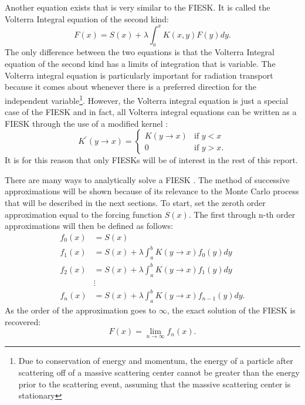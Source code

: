 Another equation exists that is very similar to the FIESK. It is called the
Volterra Integral equation of the second kind: 
\begin{equation}
  F(x) = S(x) + \lambda \int_a^x K(x,y) F(y) dy.
  \label{eq:volterra_int_eqn}
\end{equation} 
The only difference between the two equations is that the Volterra Integral 
equation of the second kind has a limits of integration that is variable. The 
Volterra integral equation is particularly important for radiation transport 
because it comes about whenever there is a preferred direction for the
independent variable\footnote{Due to conservation of energy and momentum, 
the energy of a particle after scattering off of a massive scattering center 
cannot be greater than the energy prior to the scattering event, assuming that 
the massive scattering center is stationary}. However, the Volterra integral 
equation is just a special case of the FIESK and in fact, all Volterra integral
equations can be written as a FIESK through the use of a modified kernel 
\citep{rahman_integral_2007}:
\begin{equation}
  K^{'}(y \to x) = 
  \begin{cases}
    K(y \to x) & \text{if }y < x \\
    0 & \text{if }y > x.
  \end{cases}
\end{equation}
It is for this reason that only FIESKs will be of interest in the rest of this 
report.

There are many ways to analytically solve a FIESK 
\citep{rahman_integral_2007, morse_methods_1953}. The method of 
successive approximations will be shown because of its relevance to the
Monte Carlo process that will be described in the next sections. To start,
set the zeroth order approximation equal to the forcing function $S(x)$. The
first through n-th order approximations will then be defined as follows:
\begin{align}
  f_0(x) & = S(x) \nonumber \\
  f_1(x) & = S(x) + \lambda \int_a^b K(y \to x)f_0(y)dy \nonumber \\
  f_2(x) & = S(x) + \lambda \int_a^b K(y \to x)f_1(y)dy \nonumber \\
  & \vdots \nonumber \\
  f_n(x) & = S(x) + \lambda \int_a^b K(y \to x)f_{n-1}(y)dy.
  \label{eq:nth_order_fiesk_approx} 
\end{align}
As the order of the approximation goes to $\infty$, the exact solution of
the FIESK is recovered:
\begin{equation}
  F(x) = \lim_{n \to \infty} f_n(x).
\end{equation}

